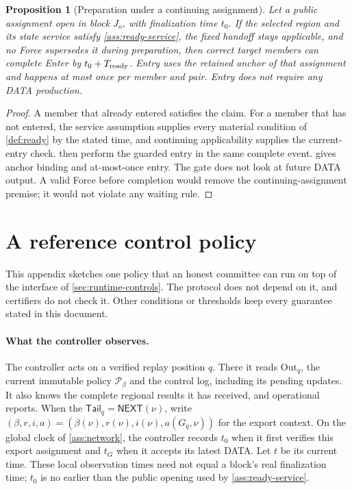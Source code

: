 \documentclass[11pt,a4paper]{article}
\newcommand{\tagg}[1]{\ensuremath{\mathsf{#1}}}
\newtheorem{proposition}[proposition]{Proposition}
\newcounter{protocol}
\begin{document}
\begin{proposition}[Preparation under a continuing assignment]
\label{prop:ready-bound}
Let a public assignment open in block $J_o$, with finalization time
$t_0$. If the selected region and its state service satisfy
\cref{ass:ready-service}, the fixed handoff stays applicable, and no
Force supersedes it during preparation, then correct target members can
complete Enter by $t_0+T_{\rm ready}$. Entry uses the retained
anchor of that assignment and happens at most once per member and pair.
Entry does not require any DATA production.
\end{proposition}
\begin{proof}
A member that already entered satisfies the claim. For a member that has
not entered, the service assumption supplies every material condition of
\cref{def:ready} by the stated time, and continuing applicability
supplies the current-entry check.  then
perform the guarded entry in the same complete event.
 gives anchor binding and at-most-once
entry. The gate does not look at future DATA output. A valid Force before
completion would remove the continuing-assignment premise; it would not
violate any waiting rule.
\end{proof}

\section{A reference control policy}
\label{app:policy}
This appendix sketches one policy that an honest committee can run on
top of the interface of \cref{sec:runtime-controls}. The protocol does
not depend on it, and certifiers do not check it. Other conditions or
thresholds keep every guarantee stated in this document.

\paragraph{What the controller observes.}
The controller acts on a verified replay position $q$. There it reads
$\mathrm{Out}_q$, the current immutable policy $\mathcal P_\beta$ and the
control log, including its pending updates. It also knows the complete
regional results it has received, and operational reports. When the
$\mathsf{Tail}_q=\tagg{NEXT}(\nu)$, write
$(\beta,r,i,a)=(\beta(\nu),r(\nu),i(\nu),a(G_q,\nu))$
for the export context. On the global clock of \cref{ass:network},
the controller records $t_0$ when it first verifies this export
assignment and $t_G$ when it accepts its latest DATA. Let $t$ be its
current time. These local observation times need not equal a block's
real finalization time; $t_0$ is no earlier than the public opening used
by \cref{ass:ready-service}.
\end{document}
